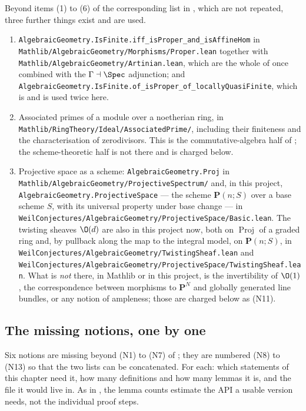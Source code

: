 Beyond items (1) to (6) of the corresponding list in ,
which are not repeated, three further things exist and are used.
\begin{enumerate}
  \item \texttt{AlgebraicGeometry.IsFinite.iff\_isProper\_and\_isAffineHom} in
  \texttt{Mathlib/AlgebraicGeometry/Morphisms/Proper.lean} together with
  \texttt{Mathlib/AlgebraicGeometry/Artinian.lean}, which are the whole of
   once combined with the
  $\Gamma\dashv\Spec$ adjunction; and
  \texttt{AlgebraicGeometry.IsFinite.of\_isProper\_of\_locallyQuasiFinite},
  which is  and is used twice here.
  \item Associated primes of a module over a noetherian ring, in
  \texttt{Mathlib/RingTheory/Ideal/AssociatedPrime/}, including their
  finiteness and the characterisation of zerodivisors.  This is the
  commutative-algebra half of ; the
  scheme-theoretic half is not there and is charged below.
  \item Projective space as a scheme: \texttt{AlgebraicGeometry.Proj} in
  \texttt{Mathlib/AlgebraicGeometry/ProjectiveSpectrum/} and, in this project,
  \texttt{AlgebraicGeometry.ProjectiveSpace} --- the scheme
  $\mathbf P(n;S)$ over a base scheme $S$, with its universal property under
  base change --- in
  \texttt{WeilConjectures/AlgebraicGeometry/ProjectiveSpace/Basic.lean}.  The
  twisting sheaves $\O(d)$ are also in this project now, both on $\operatorname{Proj}$ of a
  graded ring and, by pullback along the map to the integral model, on
  $\mathbf P(n;S)$, in
  \texttt{WeilConjectures/AlgebraicGeometry/TwistingSheaf.lean} and
  \texttt{WeilConjectures/AlgebraicGeometry/ProjectiveSpace/TwistingSheaf.lean}.
  What is \emph{not} there, in Mathlib or in this project, is the
  invertibility of $\O(1)$, the correspondence between morphisms to
  $\mathbf P^N$ and globally generated line bundles, or any notion of
  ampleness; those are charged below as (N11).
\end{enumerate}

\subsection*{The missing notions, one by one}

Six notions are missing beyond (N1) to (N7) of ; they are
numbered (N8) to (N13) so that the two lists can be concatenated.  For each:
which statements of this chapter need it, how many definitions and how many
lemmas it is, and the file it would live in.  As in , the
lemma counts estimate the API a usable version needs, not the individual proof
steps.

